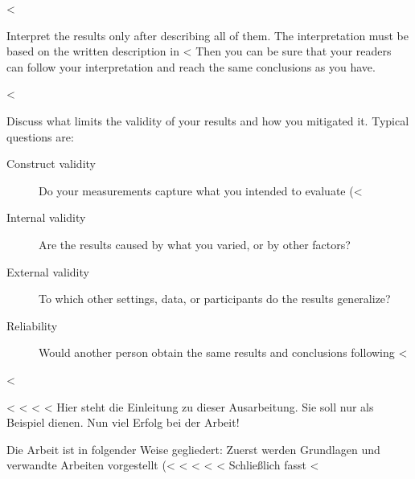{{{%
<%

Interpret the results only after describing all of them.
The interpretation must be based on the written description in <%
Then you can be sure that your readers can follow your interpretation and reach the same conclusions as you have.

<%

Discuss what limits the validity of your results and how you mitigated it.
Typical questions are:

\begin{description}
  \item[Construct validity] Do your measurements capture what you intended to evaluate (<%
  \item[Internal validity] Are the results caused by what you varied, or by other factors?
  \item[External validity] To which other settings, data, or participants do the results generalize?
  \item[Reliability] Would another person obtain the same results and conclusions following <%
\end{description}

<%

<%
<%
<%
<%
\label{sec:introduction}
Hier steht die Einleitung zu dieser Ausarbeitung.
Sie soll nur als Beispiel dienen.
Nun viel Erfolg bei der Arbeit!

Die Arbeit ist in folgender Weise gegliedert:
Zuerst werden Grundlagen und verwandte Arbeiten vorgestellt (<%
<%
<%
<%
<%
Schließlich fasst <%

}}}
